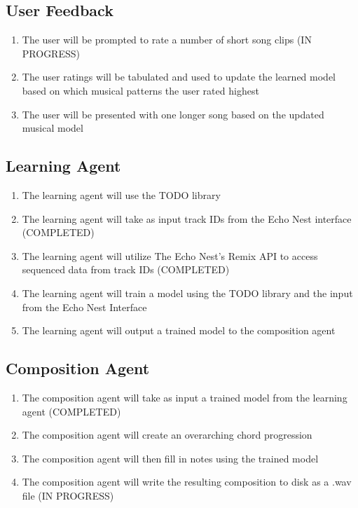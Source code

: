 \documentclass{article}
\begin{document}
\subsection{User Feedback}
\begin{enumerate}
\item The user will be prompted to rate a number of short song clips (IN PROGRESS)
\item The user ratings will be tabulated and used to update the learned model based on which musical patterns the user rated highest
\item The user will be presented with one longer song based on the updated musical model
\end{enumerate}

\subsection{Learning Agent}
\begin{enumerate}
\item The learning agent will use the TODO library
\item The learning agent will take as input track IDs from the Echo Nest interface (COMPLETED)
\item The learning agent will utilize The Echo Nest's Remix API \cite{Remix} to access sequenced data from track IDs (COMPLETED)
\item The learning agent will train a model using the TODO library and the input from the Echo Nest Interface 
\item The learning agent will output a trained model to the composition agent 
\end{enumerate}

\subsection{Composition Agent}
\begin{enumerate}
\item The composition agent will take as input a trained model from the learning agent (COMPLETED)
\item The composition agent will create an overarching chord progression
\item The composition agent will then fill in notes using the trained model
\item The composition agent will write the resulting composition to disk as a .wav file (IN PROGRESS)
\end{enumerate}
\end{document}
